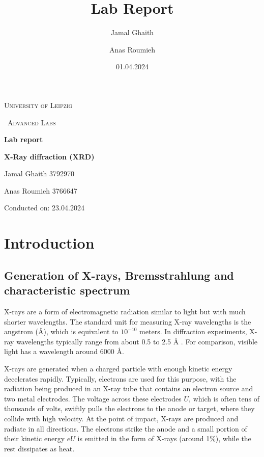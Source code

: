 \documentclass{article}
\title{Lab Report}
\author{Jamal Ghaith}
\author{Anas Roumieh}
\date{01.04.2024}
\begin{document}
\begin{titlepage}
	\centering
	{\scshape\LARGE University of Leipzig \par}
	\vspace{1cm}
	{\scshape\ Advanced Labs\par}
	\vspace{1.5cm}
	{\huge\bfseries Lab report\par}
	\vspace{2cm}
	{\huge\bfseries X-Ray diffraction (XRD)\par}
	\vspace{2cm}
	{\Large Jamal Ghaith 3792970\par}
    {\Large Anas Roumieh 3766647\par}
	\vfill

    {\Large Conducted on: 23.04.2024 \par}
	\vfill
\end{titlepage}


\tableofcontents
{}
\pagebreak{}

\section{Introduction}

\subsection{Generation of X-rays, Bremsstrahlung and characteristic spectrum}

X-rays are a form of electromagnetic radiation similar to light but with much shorter wavelengths. The standard unit for measuring X-ray wavelengths is the angstrom (Å), which is equivalent to $10^{-10}$ meters. In diffraction experiments, X-ray wavelengths typically range from about 0.5 to 2.5 Å \cite{bernarddeniscullity_2015_elements}. For comparison, visible light has a wavelength around 6000 Å. 

X-rays are generated when a charged particle with enough kinetic energy decelerates rapidly. Typically, electrons are used for this purpose, with the radiation being produced in an X-ray tube that contains an electron source and two metal electrodes. The voltage across these electrodes $U$, which is often tens of thousands of volts, swiftly pulls the electrons to the anode or target, where they collide with high velocity. At the point of impact, X-rays are produced and radiate in all directions. The electrons strike the anode and a small portion of their kinetic energy $eU$ is emitted in the form of X-rays (around 1\%), while the rest dissipates as heat. 
\end{document}
